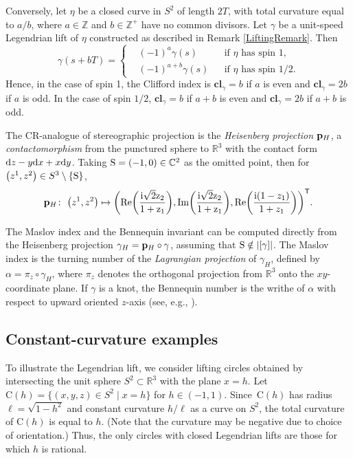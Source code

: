 \documentclass[pdftex]{sigma}
\def\ri{\mathrm{i}}
\def\gam{\gamma} %
\def\C{\mathbb C}
\def\R{\mathbb R}
\def\Z{\mathbb Z}
\newcommand\cl{\mathbf{cl}}
\newcommand\bp{{\bf p}}
\newcommand\bph{{\bp_H}} %
\newcommand\rC{\mathrm{C}}
\numberwithin{equation}{section}
\begin{document}
\begin{Remark}%
Conversely, let $\eta$ be a closed curve in $S^2$ of length $2T$, with total curvature equal to $a/b$, where $a\in \Z$ and $b\in \Z^+$ have no common divisors. Let $\gam$ be a unit-speed Legendrian lift of $\eta$ constructed as described in Remark \ref{LiftingRemark}. Then
\[\gam(s + b T) = \left\{ \begin{aligned} &(-1)^a \gam(s) & &\text{if $\eta$ has spin $1$,} \\
							&(-1)^{a+b} \gam(s) & &\text{if $\eta$ has spin $1/2$.}
\end{aligned}
\right.
\]
Hence, in the case of spin 1, the Clifford index is $\cl_\gamma = b$ if $a$ is even and $\cl_\gamma=2b$ if $a$ is odd.
In the case of spin $1/2$, $\cl_\gamma=b$ if $a+b$ is even and $\cl_\gamma=2b$ if $a+b$ is odd.
\end{Remark}

\begin{Definition} The CR-analogue of stereographic projection is the {\it Heisenberg projection} $\bp_{H}$, a {\em contactomorphism} from the punctured
sphere to $\R^3$ with the contact form ${\rm d}z-y{\rm d}x+x{\rm d}y$.
Taking ${\rm S}=(-1,0)\in \C^2$ as the omitted point, then for $\bigl(z^1,z^2\bigr)\in S^3\setminus \{{\rm S}\}$,
\begin{equation}\label{heisenbergprojection}
\bph\colon \ \bigl(z^1,z^2\bigr)\mapsto \biggl(\mathrm{Re \biggl(\frac{\ri\sqrt{2}z_2}{1+z_1}\biggr),
\mathrm{Im}\biggl(\frac{\ri\sqrt{2}z_2}{1+z_1}\biggr)},\mathrm{Re}\biggl(\frac{\ri(1-z_1)}{1+z_1}\biggr)\biggr)^{\mathsf{T}}.
\end{equation}
\end{Definition}

\begin{Remark}
The Maslov index and the Bennequin invariant can be computed directly from the Heisenberg projection $\gam_H={\bf p}_H\circ \gam$, assuming that ${\rm S}\notin |[\gam]|$.
The Maslov index is the turning number of the {\it Lagrangian projection} of $\gam_H$, defined by $\alpha = \pi_z\circ \gam_H$, where $\pi_z$ denotes the orthogonal projection from $\R^3$ onto the $xy$-coordinate plane. If $\gam$ is a knot, the Bennequin number is the writhe of $\alpha$ with respect to upward oriented $z$-axis (see, e.g., \cite{ET1}).
\end{Remark}

\subsection{Constant-curvature examples}
To illustrate the Legendrian lift, we consider lifting circles obtained
by intersecting the unit sphere $S^2 \subset \R^3$ with the plane $x=h$.
Let $\rC(h) = \bigl\{ (x,y,z) \in S^2 \mid x=h\bigr\}$ for $h \in (-1,1)$. Since~$\rC(h)$ has
radius $\ell = \sqrt{1-h^2}$ and constant curvature $h/\ell$ as a curve on $S^2$,
the total curvature of $\rC(h)$ is equal to $h$. (Note that the curvature may be negative due to choice of orientation.) Thus, the only circles with closed Legendrian lifts are those for which $h$ is rational.
\end{document}
